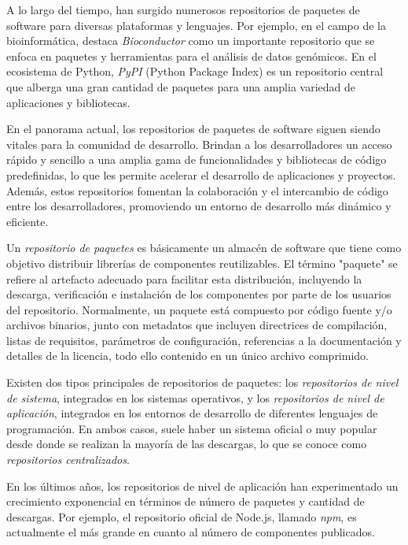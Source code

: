 A lo largo del tiempo, han surgido numerosos repositorios de paquetes de software para diversas
plataformas y lenguajes. Por ejemplo, en el campo de la bioinformática, destaca \textit{Bioconductor}
como un importante repositorio que se enfoca en paquetes y herramientas para el análisis de datos
genómicos. En el ecosistema de Python, \textit{PyPI} (Python Package Index) es un repositorio central
que alberga una gran cantidad de paquetes para una amplia variedad de aplicaciones y bibliotecas.

En el panorama actual, los repositorios de paquetes de software siguen siendo vitales para la
comunidad de desarrollo. Brindan a los desarrolladores un acceso rápido y sencillo a una amplia
gama de funcionalidades y bibliotecas de código predefinidas, lo que les permite acelerar el desarrollo
de aplicaciones y proyectos. Además, estos repositorios fomentan la colaboración y el intercambio
de código entre los desarrolladores, promoviendo un entorno de desarrollo más dinámico y eficiente.

Un \textit{repositorio de paquetes} es básicamente un almacén de software que tiene como objetivo
distribuir librerías de componentes reutilizables. El término "paquete" se refiere al artefacto
adecuado para facilitar esta distribución, incluyendo la descarga, verificación e instalación de
los componentes por parte de los usuarios del repositorio. Normalmente, un paquete está compuesto
por código fuente y/o archivos binarios, junto con metadatos que incluyen directrices de compilación,
listas de requisitos, parámetros de configuración, referencias a la documentación y detalles de la
licencia, todo ello contenido en un único archivo comprimido.

Existen dos tipos principales de repositorios de paquetes: los \textit{repositorios de nivel de sistema},
integrados en los sistemas operativos, y los \textit{repositorios de nivel de aplicación}, integrados
en los entornos de desarrollo de diferentes lenguajes de programación. En ambos casos, suele haber un
sistema oficial o muy popular desde donde se realizan la mayoría de las descargas, lo que se conoce
como \textit{repositorios centralizados}.

En los últimos años, los repositorios de nivel de aplicación han experimentado un crecimiento exponencial
en términos de número de paquetes y cantidad de descargas. Por ejemplo, el repositorio oficial de
Node.js, llamado \textit{npm}, es actualmente el más grande en cuanto al número de componentes
publicados.

